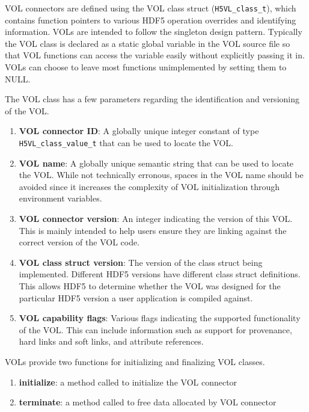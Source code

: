 VOL connectors are defined using the VOL class struct (\texttt{H5VL\_class\_t}), which contains function pointers to various HDF5 operation overrides and identifying information. VOLs are intended to follow the singleton design pattern. Typically the VOL class is declared as a static global variable in the VOL source file so that VOL functions can access the variable easily without explicitly passing it in. VOLs can choose to leave most functions unimplemented by setting them to NULL.

The VOL class has a few parameters regarding the identification and versioning of the VOL.
\begin{enumerate}
    \item \textbf{VOL connector ID}: A globally unique integer constant of type \texttt{H5VL\_class\_value\_t} that can be used to locate the VOL.
    \item \textbf{VOL name}: A globally unique semantic string that can be used to locate the VOL. While not technically erronous, spaces in the VOL name should be avoided since it increases the complexity of VOL initialization through environment variables.
    \item \textbf{VOL connector version}: An integer indicating the version of this VOL. This is mainly intended to help users ensure they are linking against the correct version of the VOL code.
    \item \textbf{VOL class struct version}: The version of the class struct being implemented. Different HDF5 versions have different class struct definitions. This allows HDF5 to determine whether the VOL was designed for the particular HDF5 version a user application is compiled against.
    \item \textbf{VOL capability flags}: Various flags indicating the supported functionality of the VOL. This can include information such as support for provenance, hard links and soft links, and attribute references.
\end{enumerate}

VOLs provide two functions for initializing and finalizing VOL classes.
\begin{enumerate}
    \item \textbf{initialize}: a method called to initialize the VOL connector
    \item \textbf{terminate}: a method called to free data allocated by VOL connector
\end{enumerate}

